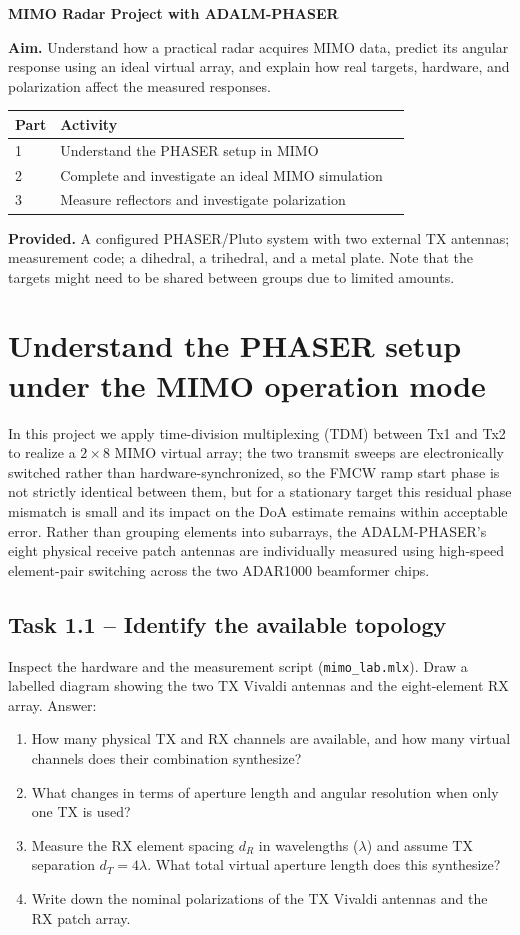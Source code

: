 \documentclass[11pt,a4paper]{article}
\newcommand{\task}[2]{\subsection*{Task #1 -- #2}}
\begin{document}
\begin{center}

{\LARGE\bfseries MIMO Radar Project with ADALM-PHASER\\[6pt]}

\end{center}

\textbf{Aim.} Understand how a practical radar acquires MIMO data, predict its
angular response using an ideal virtual array, and explain how real targets,
hardware, and polarization affect the measured responses.

\begin{tabularx}{\textwidth}{@{}lXr@{}}
\toprule
Part & Activity \\
\midrule
1 & Understand the PHASER setup in MIMO \\
2 & Complete and investigate an ideal MIMO simulation  \\
3 & Measure reflectors and investigate polarization \\
\bottomrule
\end{tabularx}

\textbf{Provided.} A configured PHASER/Pluto system with two external TX antennas; measurement code; a dihedral, a trihedral, and a metal plate. Note that the targets might need to be shared between groups due to limited amounts.


\section{Understand the PHASER setup under the MIMO operation mode}

In this project we apply time-division multiplexing (TDM) between Tx1 and Tx2 to realize a $2\times 8$ MIMO virtual array; the two transmit sweeps are electronically switched rather than hardware-synchronized, so the FMCW ramp start phase is not strictly identical between them, but for a stationary target this residual phase mismatch is small and its impact on the DoA estimate remains within acceptable error. Rather than grouping elements into subarrays, the ADALM-PHASER's eight physical receive patch antennas are individually measured using high-speed element-pair switching across the two ADAR1000 beamformer chips.

\task{1.1}{Identify the available topology}
Inspect the hardware and the measurement script (\texttt{mimo\_lab.mlx}). Draw a labelled diagram showing the two TX Vivaldi antennas and the eight-element RX array. Answer:
\begin{enumerate}
\item How many physical TX and RX channels are available, and how many virtual channels does their combination synthesize?
\item What changes in terms of aperture length and angular resolution when only one TX is used?
\item Measure the RX element spacing $d_R$ in wavelengths ($\lambda$) and assume TX separation $d_T=4\lambda$. What total virtual aperture length does this synthesize?
\item Write down the nominal polarizations of the TX Vivaldi antennas and the RX patch array.
\end{enumerate}
\end{document}
